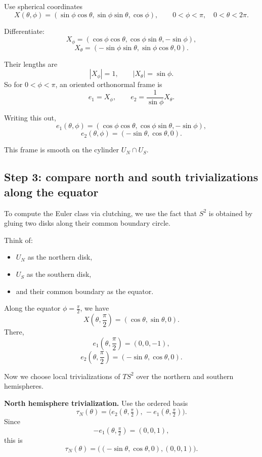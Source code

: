\documentclass[11pt]{article}
\begin{document}
	Use spherical coordinates
	\[
	X(\theta,\phi)
	=
	(\sin\phi\cos\theta,\sin\phi\sin\theta,\cos\phi),
	\qquad
	0<\phi<\pi,\quad 0<\theta<2\pi.
	\]
	
	Differentiate:
	\[
	X_\phi
	=
	(\cos\phi\cos\theta,\cos\phi\sin\theta,-\sin\phi),
	\]
	\[
	X_\theta
	=
	(-\sin\phi\sin\theta,\sin\phi\cos\theta,0).
	\]
	
	Their lengths are
	\[
	|X_\phi|=1,
	\qquad
	|X_\theta|=\sin\phi.
	\]
	So for \(0<\phi<\pi\), an oriented orthonormal frame is
	\[
	e_1 = X_\phi,
	\qquad
	e_2 = \frac{1}{\sin\phi}X_\theta.
	\]
	
	Writing this out,
	\[
	e_1(\theta,\phi)
	=
	(\cos\phi\cos\theta,\cos\phi\sin\theta,-\sin\phi),
	\]
	\[
	e_2(\theta,\phi)
	=
	(-\sin\theta,\cos\theta,0).
	\]
	
	This frame is smooth on the cylinder \(U_N\cap U_S\).
	
	\subsection*{Step 3: compare north and south trivializations along the equator}
	
	To compute the Euler class via clutching, we use the fact that \(S^2\) is obtained by gluing two disks along their common boundary circle.
	
	Think of:
	\begin{itemize}
		\item \(U_N\) as the northern disk,
		\item \(U_S\) as the southern disk,
		\item and their common boundary as the equator.
	\end{itemize}
	
	Along the equator \(\phi=\frac{\pi}{2}\), we have
	\[
	X\!\left(\theta,\frac{\pi}{2}\right)=(\cos\theta,\sin\theta,0).
	\]
	There,
	\[
	e_1\!\left(\theta,\frac{\pi}{2}\right)
	=
	(0,0,-1),
	\]
	\[
	e_2\!\left(\theta,\frac{\pi}{2}\right)
	=
	(-\sin\theta,\cos\theta,0).
	\]
	
	Now we choose local trivializations of \(TS^2\) over the northern and southern hemispheres.
	
	\medskip
	
	\noindent
	\textbf{North hemisphere trivialization.}
	Use the ordered basis
	\[
	\tau_N(\theta)=\bigl(e_2(\theta,\tfrac{\pi}{2}),\, -e_1(\theta,\tfrac{\pi}{2})\bigr).
	\]
	Since
	\[
	-e_1(\theta,\tfrac{\pi}{2})=(0,0,1),
	\]
	this is
	\[
	\tau_N(\theta)=\bigl((-\sin\theta,\cos\theta,0),(0,0,1)\bigr).
	\]
	
\end{document}
